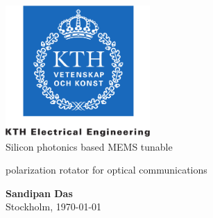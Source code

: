 \documentclass[../report.tex]{subfiles}
\begin{document}
	
    \begin{titlepage}
        \thispagestyle{empty}
        \begin{center}
            \includegraphics[height=5cm]{./Ch0.2-Title/kth_cmyk_info_comm_tech}\\
            \vspace{2.5cm}
	            \huge{Silicon photonics based MEMS tunable}
	        \begin{adjustwidth*}{-0.1cm}{-0.1cm}
	        	\huge{polarization rotator for optical communications}\\
		    \end{adjustwidth*}
            \vspace{4cm}
            \Large{\textbf{Sandipan Das}}\\
            \vspace{4cm}
            \Large{Stockholm, \today}
        \end{center} 
    \end{titlepage}
\end{document}
